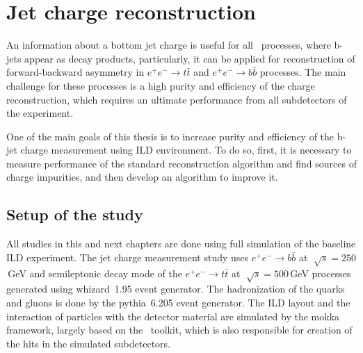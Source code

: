 

\section{Jet charge reconstruction}
\label{sec:JetChargeReconstruction}
An information about a bottom jet charge is useful for all \sm\ processes, where b-jets appear as decay products, particularly, it can be applied for reconstruction of forward-backward asymmetry in $e^+e^-\to t\bar{t}$ and $e^+e^- \to b\bar{b}$ processes. 
The main challenge for these processes is a high purity and efficiency of the charge reconstruction, which requires an ultimate performance from all subdetectors of the experiment. 

One of the main goals of this thesis is to increase purity and efficiency of the b-jet charge measurement using ILD environment. 
To do so, first, it is necessary to measure performance of the standard reconstruction algorithm and find sources of charge impurities, and then develop an algorithm to improve it. 



\subsection{Setup of the study}

All studies in this and next chapters are done using full simulation of the baseline ILD experiment. 
The jet charge measurement study uses $e^+e^- \to b\bar{b}$ at $\sqrt[]{s} = 250$\,GeV and semileptonic decay mode of the $e^+e^- \to t\bar{t}$ at $\sqrt[]{s} = 500$\,GeV processes generated using {\sc whizard}~1.95 event generator. 
The hadronization of the quarks and gluons is done by the {\sc pythia}~6.205 event generator. 
The ILD layout and the interaction of particles with the detector material are simulated by the {\sc mokka} framework, largely based on the \geant\ toolkit, which is also responsible for creation of the hits in the simulated subdetectors. 

